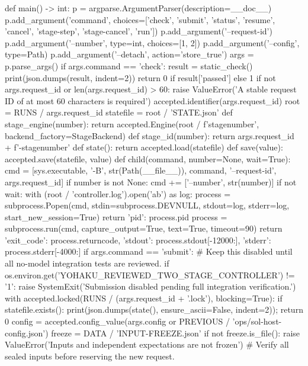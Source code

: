def main() -> int:
    p = argparse.ArgumentParser(description=__doc__)
    p.add_argument('command', choices=['check', 'submit', 'status', 'resume', 'cancel', 'stage-step', 'stage-cancel', 'run'])
    p.add_argument('--request-id')
    p.add_argument('--number', type=int, choices=[1, 2])
    p.add_argument('--config', type=Path)
    p.add_argument('--detach', action='store_true')
    args = p.parse_args()
    if args.command == 'check':
        result = static_check()
        print(json.dumps(result, indent=2))
        return 0 if result['passed'] else 1
    if not args.request_id or len(args.request_id) > 60:
        raise ValueError('A stable request ID of at most 60 characters is required')
    accepted.identifier(args.request_id)
    root = RUNS / args.request_id
    statefile = root / 'STATE.json'
    def stage_engine(number):
        return accepted.Engine(root / f'stage{number}', backend_factory=StageBackend)
    def stage_id(number):
        return args.request_id + f'-stage{number}'
    def state():
        return accepted.load(statefile)
    def save(value):
        accepted.save(statefile, value)
    def child(command, number=None, wait=True):
        cmd = [sys.executable, '-B', str(Path(__file__)), command, '--request-id', args.request_id]
        if number is not None:
            cmd += ['--number', str(number)]
        if not wait:
            with (root / 'controller.log').open('ab') as log:
                process = subprocess.Popen(cmd, stdin=subprocess.DEVNULL, stdout=log, stderr=log, start_new_session=True)
            return {'pid': process.pid}
        process = subprocess.run(cmd, capture_output=True, text=True, timeout=90)
        return {'exit_code': process.returncode, 'stdout': process.stdout[-12000:], 'stderr': process.stderr[-4000:]}
    if args.command == 'submit':
        # Keep this disabled until all no-model integration tests are reviewed.
        if os.environ.get('YOHAKU_REVIEWED_TWO_STAGE_CONTROLLER') != '1':
            raise SystemExit('Submission disabled pending full integration verification.')
        with accepted.locked(RUNS / (args.request_id + '.lock'), blocking=True):
            if statefile.exists():
                print(json.dumps(state(), ensure_ascii=False, indent=2)); return 0
            config = accepted.config_value(args.config or PREVIOUS / 'ops/sol-host-config.json')
            freeze = DATA / 'INPUT-FREEZE.json'
            if not freeze.is_file():
                raise ValueError('Inputs and independent expectations are not frozen')
            # Verify all sealed inputs before reserving the new request.
